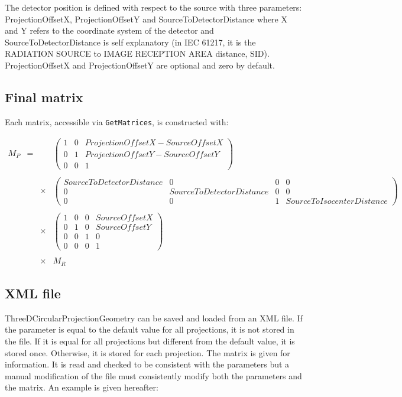 \documentclass{article}
\begin{document}
The detector position is defined with respect to the source with three parameters: ProjectionOffsetX, ProjectionOffsetY and SourceToDetectorDistance where X and Y refers to the coordinate system of the detector and SourceToDetectorDistance is self explanatory (in IEC 61217, it is the RADIATION SOURCE to IMAGE RECEPTION AREA distance, SID). ProjectionOffsetX and ProjectionOffsetY are optional and zero by default.

\subsection{Final matrix}

Each matrix, accessible via \verb+GetMatrices+, is constructed with:

$$
\begin{array}{lcll}
  M_P & = & & %
  \begin{pmatrix}
    1 & 0 & ProjectionOffsetX-SourceOffsetX  \\
    0 & 1 & ProjectionOffsetY-SourceOffsetY  \\
    0 & 0 & 1
  \end{pmatrix} %
  \\ \\ & & \times & %
  \begin{pmatrix}
    SourceToDetectorDistance & 0 & 0 & 0  \\
    0 & SourceToDetectorDistance & 0 & 0  \\
    0 & 0 & 1 & SourceToIsocenterDistance
  \end{pmatrix} %
  \\ \\ & & \times & %
  \begin{pmatrix}
    1 & 0 & 0 & SourceOffsetX  \\
    0 & 1 & 0 & SourceOffsetY  \\
    0 & 0 & 1 & 0 \\
    0 & 0 & 0 & 1
  \end{pmatrix} %
  \\ \\ & & \times & %
  M_R
\end{array}
$$

\subsection{XML file}

ThreeDCircularProjectionGeometry can be saved and loaded from an XML file. If the parameter is equal to the default value for all projections, it is not stored in the file. If it is equal for all projections but different from the default value, it is stored once. Otherwise, it is stored for each projection. The matrix is given for information. It is read and checked to be consistent with the parameters but a manual modification of the file must consistently modify both the parameters and the matrix. An example is given hereafter:
\end{document}
